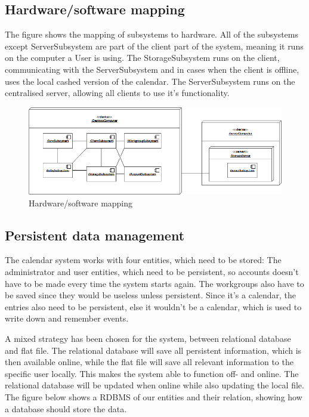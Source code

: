 \pagebreak

\subsection{Hardware/software mapping}
The figure shows the mapping of subsystems to hardware. All of the subsystems except ServerSubsystem are part of the client part of the system, meaning it runs on the computer a User is using. 
The StorageSubsystem runs on the client, communicating with the ServerSubsystem and in cases when the client is offline, uses the local cashed version of the calendar. The ServerSubsystem runs on the centralised server, allowing all clients to use it’s functionality.

\begin{figure}[h]
\centering
\includegraphics[scale = 0.7]{deployment}
\caption{Hardware/software mapping}
\end{figure}

\subsection{Persistent data management}

The calendar system works with four entities, which need to be stored: The administrator and user entities, which need to be persistent, so accounts  doesn’t have to be made every time the system starts again. The workgroups also have to be saved since they would be useless unless persistent.
	Since it’s a calendar, the entries also need to be persistent, else it wouldn’t be a calendar, which is used to write down and remember events.

A mixed strategy has been chosen for the system, between relational database and flat file. The relational database will save all persistent information, which is then available online, while the flat file will save all relevant information to the specific user locally.
	This makes the system able to function off- and online. The relational database will be updated when online while also updating the local file. 
\newline
The figure below shows a RDBMS of our entities and their relation, showing how a database should store the data.

